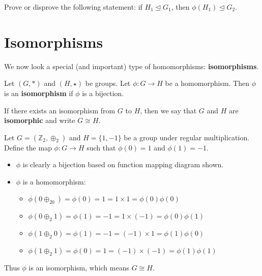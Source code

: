 \begin{exercise}
    Prove or disprove the following statement: if $H_1 \unlhd G_1$, then $\phi(H_1) \unlhd G_2$.
\end{exercise}

\section{Isomorphisms}
We now look a special (and important) type of homomorphisms: \textbf{isomorphisms}.

\begin{definition}
    Let $(G, \ast)$ and $(H, \star)$ be groups. Let $\phi: G \to H$ be a homomorphism. Then $\phi$ is an \textbf{isomorphism} if $\phi$ is a bijection.
\end{definition}

If there exists an isomorphism from $G$ to $H$, then we say that $G$ and $H$ are \textbf{isomorphic} and write $G \cong H$.

\newpage

\begin{example}
    Let $G = (\mathbb{Z}_2, \oplus_2)$ and $H = \{1, -1\}$ be a group under regular multiplication. Define the map $\phi: G \to H$ such that $\phi(0) = 1$ and $\phi(1) = -1$.

    \begin{itemize}
        \item $\phi$ is clearly a bijection based on function mapping diagram shown.
        \begin{figure}[h]
            \centering
        \end{figure}
        \item $\phi$ is a homomorphism:\begin{itemize}
            \item $\phi(0\oplus_20) = \phi(0) = 1 = 1 \times 1 = \phi(0)\phi(0)$
            \item $\phi(0 \oplus_2 1) = \phi(1) = -1 = 1 \times (-1) = \phi(0)\phi(1)$
            \item $\phi(1 \oplus_2 0) = \phi(1) = -1 = (-1) \times 1 = \phi(1)\phi(0)$
            \item $\phi(1 \oplus_2 1) = \phi(0) = 1 = (-1) \times (-1) = \phi(1)\phi(1)$
        \end{itemize}
    \end{itemize}
    Thus $\phi$ is an isomorphism, which means $G \cong H$.
\end{example}

